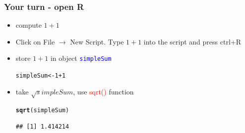 \documentclass[12pt]{beamer}\usepackage[]{graphicx}\usepackage[]{color}
\makeatletter
\newcommand{\hlnum}[1]{\textcolor[rgb]{0.686,0.059,0.569}{#1}}%
\newcommand{\hlopt}[1]{\textcolor[rgb]{0,0,0}{#1}}%
\newcommand{\hlstd}[1]{\textcolor[rgb]{0.345,0.345,0.345}{#1}}%
\newcommand{\hlkwb}[1]{\textcolor[rgb]{0.69,0.353,0.396}{#1}}%
\newcommand{\hlkwd}[1]{\textcolor[rgb]{0.737,0.353,0.396}{\textbf{#1}}}%
\newenvironment{kframe}{%
 \def\at@end@of@kframe{}%
 \ifinner\ifhmode%
  \def\at@end@of@kframe{\end{minipage}}%
  \begin{minipage}{\columnwidth}%
 \fi\fi%
 \def\FrameCommand##1{\hskip\@totalleftmargin \hskip-\fboxsep
 \colorbox{shadecolor}{##1}\hskip-\fboxsep
     \hskip-\linewidth \hskip-\@totalleftmargin \hskip\columnwidth}%
 \MakeFramed {\advance\hsize-\width
   \@totalleftmargin\z@ \linewidth\hsize
   \@setminipage}}%
 {\par\unskip\endMakeFramed%
 \at@end@of@kframe}
\newenvironment{knitrout}{}{} %
\makeatother
\begin{document}

\begin{frame}[fragile]\large
\frametitle{Your turn - open R}

\begin{itemize}
 \item compute $1+1$ 
 \item Click on File $\rightarrow$ New Script. Type $1+1$ into the script and press ctrl+R
 \item store $1+1$ in object \textcolor{blue}{\texttt{simpleSum}}
\begin{knitrout}
\color{fgcolor}\begin{kframe}
\begin{alltt}
\hlstd{simpleSum} \hlkwb{<-} \hlnum{1}\hlopt{+}\hlnum{1}
\end{alltt}
\end{kframe}
\end{knitrout}
 \item take $\sqrt simpleSum$,  use \textcolor{red}{sqrt()} function
\begin{knitrout}
\color{fgcolor}\begin{kframe}
\begin{alltt}
\hlkwd{sqrt}\hlstd{(simpleSum)}
\end{alltt}
\begin{verbatim}
## [1] 1.414214
\end{verbatim}
\end{kframe}
\end{knitrout}
\end{itemize}

\end{frame}

\end{document}
